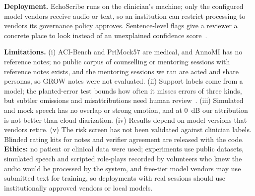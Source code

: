 \textbf{Deployment.} EchoScribe runs on the clinician's machine; only the configured model vendors receive audio or text, so an institution can restrict processing to vendors its governance policy approves. Sentence-level flags give a reviewer a concrete place to look instead of an unexplained confidence score~\cite{guo2017calibration}.

\textbf{Limitations.} (i) ACI-Bench and PriMock57 are medical, and AnnoMI has no reference notes; no public corpus of counselling or mentoring sessions with reference notes exists\ifmentoring, and the mentoring sessions we ran are acted and share personas\else, so GROW notes were not evaluated\fi. (ii) Support labels come from a model; the planted-error test bounds how often it misses errors of three kinds, but subtler omissions and misattributions need human review~\cite{asgari2025}. (iii) Simulated and mock speech has no overlap or strong emotion, and at 0~dB our attribution is not better than cloud diarization. (iv) Results depend on model versions that vendors retire. (v) The risk screen has not been validated against clinician labels. Blinded rating kits for notes and verifier agreement are released with the code. \textbf{Ethics:} no patient or clinical data were used; experiments use public datasets, simulated speech and scripted role-plays recorded by volunteers who knew the audio would be processed by the system, and free-tier model vendors may use submitted text for training, so deployments with real sessions should use institutionally approved vendors or local models.

